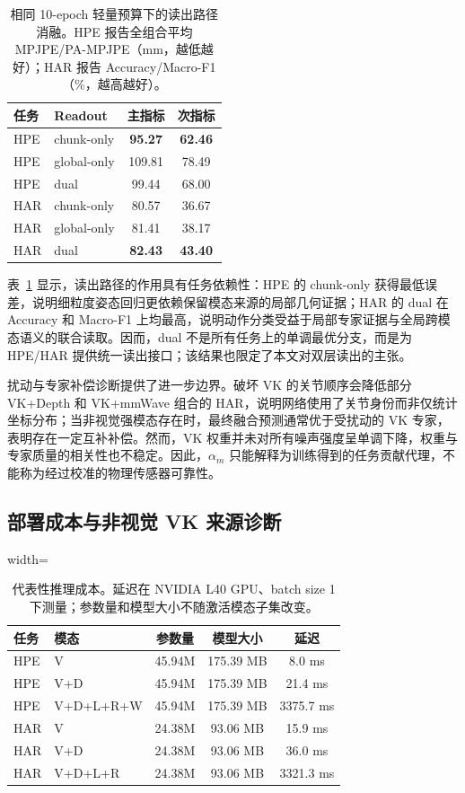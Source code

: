 \documentclass[journal]{IEEEtran}
\begin{document}
\begin{table}[H]
\centering
\caption{相同 10-epoch 轻量预算下的读出路径消融。HPE 报告全组合平均 MPJPE/PA-MPJPE（mm，越低越好）；HAR 报告 Accuracy/Macro-F1（\%，越高越好）。}
\label{tab:readout_ablation}
\footnotesize
\begin{tabular}{llcc}
\toprule
任务 & Readout & 主指标 & 次指标 \\
\midrule
HPE & chunk-only & \textbf{95.27} & \textbf{62.46} \\
HPE & global-only & 109.81 & 78.49 \\
HPE & dual & 99.44 & 68.00 \\
\midrule
HAR & chunk-only & 80.57 & 36.67 \\
HAR & global-only & 81.41 & 38.17 \\
HAR & dual & \textbf{82.43} & \textbf{43.40} \\
\bottomrule
\end{tabular}
\end{table}

表~\ref{tab:readout_ablation} 显示，读出路径的作用具有任务依赖性：HPE 的 chunk-only 获得最低误差，说明细粒度姿态回归更依赖保留模态来源的局部几何证据；HAR 的 dual 在 Accuracy 和 Macro-F1 上均最高，说明动作分类受益于局部专家证据与全局跨模态语义的联合读取。因而，dual 不是所有任务上的单调最优分支，而是为 HPE/HAR 提供统一读出接口；该结果也限定了本文对双层读出的主张。

扰动与专家补偿诊断提供了进一步边界。破坏 VK 的关节顺序会降低部分 VK+Depth 和 VK+mmWave 组合的 HAR，说明网络使用了关节身份而非仅统计坐标分布；当非视觉强模态存在时，最终融合预测通常优于受扰动的 VK 专家，表明存在一定互补补偿。然而，VK 权重并未对所有噪声强度呈单调下降，权重与专家质量的相关性也不稳定。因此，$\alpha_m$ 只能解释为训练得到的任务贡献代理，不能称为经过校准的物理传感器可靠性。

\subsection{部署成本与非视觉 VK 来源诊断}

\begin{table}[H]
\centering
\caption{代表性推理成本。延迟在 NVIDIA L40 GPU、batch size 1 下测量；参数量和模型大小不随激活模态子集改变。}
\label{tab:deployment_cost}
\footnotesize
\begin{adjustbox}{width=\columnwidth}
\begin{tabular}{llccc}
\toprule
任务 & 模态 & 参数量 & 模型大小 & 延迟 \\
\midrule
HPE & V & 45.94M & 175.39 MB & 8.0 ms \\
HPE & V+D & 45.94M & 175.39 MB & 21.4 ms \\
HPE & V+D+L+R+W & 45.94M & 175.39 MB & 3375.7 ms \\
HAR & V & 24.38M & 93.06 MB & 15.9 ms \\
HAR & V+D & 24.38M & 93.06 MB & 36.0 ms \\
HAR & V+D+L+R & 24.38M & 93.06 MB & 3321.3 ms \\
\bottomrule
\end{tabular}
\end{adjustbox}
\end{table}
\end{document}
